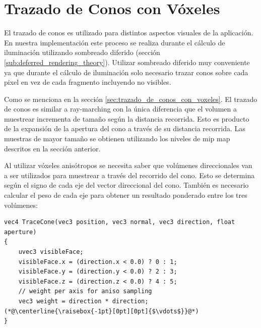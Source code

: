 \section{Trazado de Conos con Vóxeles} %
\label{sec:trazado_de_conos}
El trazado de conos es utilizado para distintos aspectos visuales de la aplicación. En nuestra implementación este proceso se realiza durante el cálculo de iluminación utilizando sombreado diferido (sección \ref{sub:deferred_rendering_theory}). Utilizar sombreado diferido muy conveniente ya que durante el cálculo de iluminación solo necesario trazar conos sobre cada pixel en vez de cada fragmento incluyendo no visibles.

Como se menciona en la sección \ref{sec:trazado_de_conos_con_voxeles}. El trazado de conos es similar a ray-marching con la única diferencia que el volumen a muestrear incrementa de tamaño según la distancia recorrida. Esto es producto de la expansión de la apertura del cono a través de su distancia recorrida. Las muestras de mayor tamaño se obtienen utilizando los niveles de mip map descritos en la sección anterior.

Al utilizar vóxeles anisótropos se necesita saber que volúmenes direccionales van a ser utilizados para muestrear a través del recorrido del cono. Esto se determina según el signo de cada eje del vector direccional del cono. También es necesario calcular el peso de cada eje para obtener un resultado ponderado entre los tres volúmenes:
\\
\begin{lstlisting}[caption={Lógica para determinar volúmenes direccionales a utilizar durante el trazado de conos y peso por eje.}, label=Trace0]
vec4 TraceCone(vec3 position, vec3 normal, vec3 direction, float aperture)
{
    uvec3 visibleFace;
    visibleFace.x = (direction.x < 0.0) ? 0 : 1;
    visibleFace.y = (direction.y < 0.0) ? 2 : 3;
    visibleFace.z = (direction.z < 0.0) ? 4 : 5;
    // weight per axis for aniso sampling
    vec3 weight = direction * direction;
(*@\centerline{\raisebox{-1pt}[0pt][0pt]{$\vdots$}}@*)
}
\end{lstlisting}

